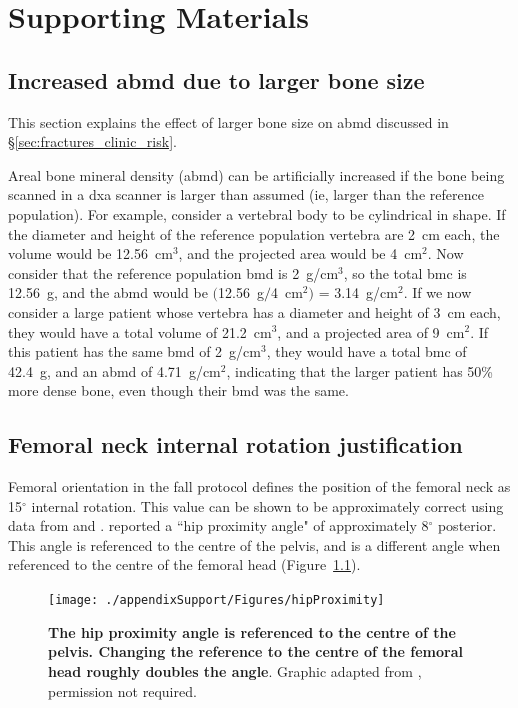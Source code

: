 \chapter{Supporting Materials}

\section{Increased \acs*{abmd} due to larger bone size}
\label{sec:support_abmd}
This section explains the effect of larger bone size on \ac{abmd} discussed in \S\ref{sec:fractures_clinic_risk}.

Areal bone mineral density (\acs{abmd}) can be artificially increased if the bone being scanned in a \acf{dxa} scanner is larger than assumed (\ac{ie}, larger than the reference population).
For example, consider a vertebral body to be cylindrical in shape.
If the diameter and height of the reference population vertebra are 2~\ac{cm} each, the volume would be 12.56~\ac{cm}$^3$, and the projected area would be 4~\ac{cm}$^2$.
Now consider that the reference population \ac{bmd} is 2~\ac{g}/\ac{cm}$^3$, so the total \ac{bmc} is 12.56~\ac{g}, and the \ac{abmd} would be $($12.56~\ac{g}$/$4~\ac{cm}$^2)$ = 3.14~\ac{g}/\ac{cm}$^2$.
If we now consider a large patient whose vertebra has a diameter and height of 3~\ac{cm} each, they would have a total volume of 21.2~\ac{cm}$^3$, and a projected area of 9~\ac{cm}$^2$.
If this patient has the same \ac{bmd} of 2~\ac{g}/\ac{cm}$^3$, they would have a total \ac{bmc} of 42.4~\ac{g}, and an \ac{abmd} of 4.71~\ac{g}/\ac{cm}$^2$, indicating that the larger patient has 50\% more dense bone, even though their \ac{bmd} was the same.

\section{Femoral neck internal rotation justification}
\label{sec:support_orientation}
Femoral orientation in the fall protocol defines the position of the femoral neck as 15$^\circ$ internal rotation.
This value can be shown to be approximately correct using data from \citet{toogood_proximal_2009} and \citet{feldman_reducing_2007}.
\citet{feldman_reducing_2007} reported a ``hip proximity angle" of approximately 8$^\circ$ posterior.
This angle is referenced to the centre of the pelvis, and is a different angle when referenced to the centre of the femoral head (Figure~\ref{fig:hipProximity}).

\begin{figure}
	\centering
	\texttt{[image: ./appendixSupport/Figures/hipProximity]}
	\caption[Hip proximity related to femoral head]{\textbf{The hip proximity angle is referenced to the centre of the pelvis. Changing the reference to the centre of the femoral head roughly doubles the angle}. Graphic adapted from \citet{inversitus_prostatic_2012}, permission not required.}
	\label{fig:hipProximity}
\end{figure}

